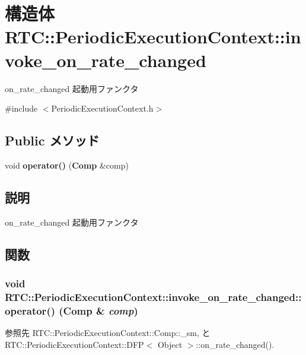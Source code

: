 \section{構造体 RTC::PeriodicExecutionContext::invoke\_\-on\_\-rate\_\-changed}
\label{structRTC_1_1PeriodicExecutionContext_1_1invoke__on__rate__changed}


on\_\-rate\_\-changed 起動用ファンクタ  




{\ttfamily \#include $<$PeriodicExecutionContext.h$>$}

\subsection*{Public メソッド}
\begin{DoxyCompactItemize}
\item 
void {\bf operator()} ({\bf Comp} \&comp)
\end{DoxyCompactItemize}


\subsection{説明}
on\_\-rate\_\-changed 起動用ファンクタ 

\subsection{関数}
\subsubsection[{operator()}]{\setlength{\rightskip}{0pt plus 5cm}void RTC::PeriodicExecutionContext::invoke\_\-on\_\-rate\_\-changed::operator() ({\bf Comp} \& {\em comp})\hspace{0.3cm}{\ttfamily  [inline]}}\label{structRTC_1_1PeriodicExecutionContext_1_1invoke__on__rate__changed_a374c72b2f2d5fa61d9eb6e3476731959}


参照先 RTC::PeriodicExecutionContext::Comp::\_\-sm, と RTC::PeriodicExecutionContext::DFP$<$ Object $>$::on\_\-rate\_\-changed().

